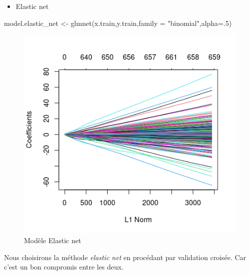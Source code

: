 \documentclass[
  12pt,
]{article}
\newenvironment{Shaded}{\begin{snugshade}}{\end{snugshade}}
\newcommand{\AttributeTok}[1]{\textcolor[rgb]{0.77,0.63,0.00}{#1}}
\newcommand{\DecValTok}[1]{\textcolor[rgb]{0.00,0.00,0.81}{#1}}
\newcommand{\FloatTok}[1]{\textcolor[rgb]{0.00,0.00,0.81}{#1}}
\newcommand{\FunctionTok}[1]{\textcolor[rgb]{0.00,0.00,0.00}{#1}}
\newcommand{\NormalTok}[1]{#1}
\newcommand{\OtherTok}[1]{\textcolor[rgb]{0.56,0.35,0.01}{#1}}
\newcommand{\SpecialCharTok}[1]{\textcolor[rgb]{0.00,0.00,0.00}{#1}}
\newcommand{\StringTok}[1]{\textcolor[rgb]{0.31,0.60,0.02}{#1}}
\providecommand{\tightlist}{%
  \setlength{\itemsep}{0pt}\setlength{\parskip}{0pt}}
\begin{document}
\begin{itemize}
\tightlist
\item
  Elastic net
\end{itemize}

\begin{Shaded}
\begin{Highlighting}[]
\NormalTok{model.elastic\_net }\OtherTok{\textless{}{-}} \FunctionTok{glmnet}\NormalTok{(x.train,y.train,}\AttributeTok{family =} \StringTok{"binomial"}\NormalTok{,}\AttributeTok{alpha=}\NormalTok{.}\DecValTok{5}\NormalTok{)}
\end{Highlighting}
\end{Shaded}

\begin{figure}

{\centering \includegraphics[width=0.5\linewidth]{pictures/elastic_net} 

}

\caption{ Modèle Elastic net}\label{fig:fig_EN}
\end{figure}

Nous choisirons la méthode \emph{elastic net} en procédant par
validation croisée. Car c'est un bon compromis entre les deux.

\begin{Shaded}
\end{Shaded}
\end{document}
